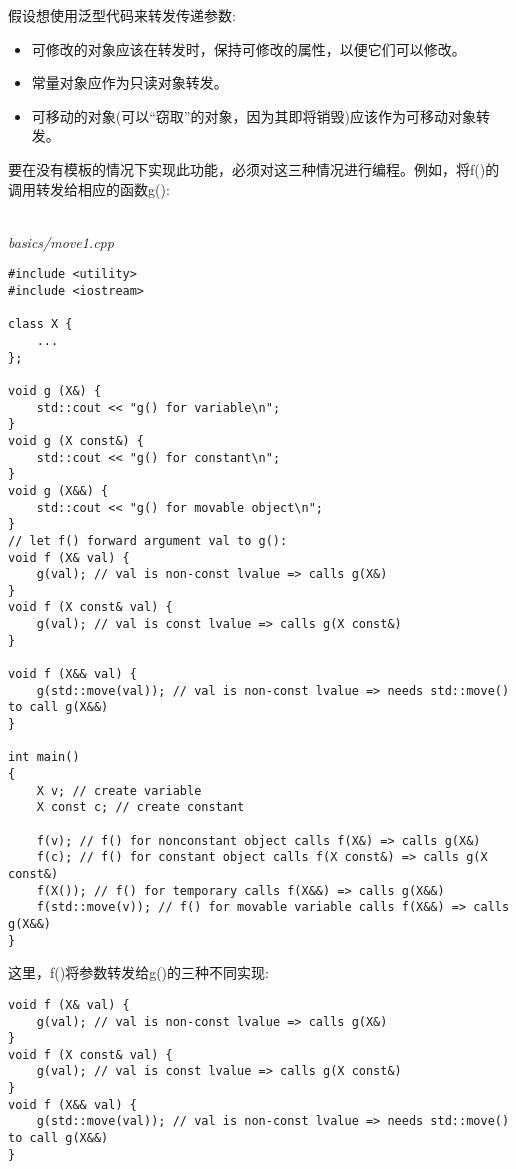 假设想使用泛型代码来转发传递参数:

\begin{itemize}
\item 
可修改的对象应该在转发时，保持可修改的属性，以便它们可以修改。

\item 
常量对象应作为只读对象转发。

\item 
可移动的对象(可以“窃取”的对象，因为其即将销毁)应该作为可移动对象转发。
\end{itemize}

要在没有模板的情况下实现此功能，必须对这三种情况进行编程。例如，将f()的调用转发给相应的函数g():

\hspace*{\fill} \\ %
\noindent
\textit{basics/move1.cpp}
\begin{lstlisting}[style=styleCXX]
#include <utility>
#include <iostream>

class X {
	...
};

void g (X&) {
	std::cout << "g() for variable\n";
}
void g (X const&) {
	std::cout << "g() for constant\n";
}
void g (X&&) {
	std::cout << "g() for movable object\n";
}
// let f() forward argument val to g():
void f (X& val) {
	g(val); // val is non-const lvalue => calls g(X&)
}
void f (X const& val) {
	g(val); // val is const lvalue => calls g(X const&)
}

void f (X&& val) {
	g(std::move(val)); // val is non-const lvalue => needs std::move() to call g(X&&)
}

int main()
{
	X v; // create variable
	X const c; // create constant
	
	f(v); // f() for nonconstant object calls f(X&) => calls g(X&)
	f(c); // f() for constant object calls f(X const&) => calls g(X const&)
	f(X()); // f() for temporary calls f(X&&) => calls g(X&&)
	f(std::move(v)); // f() for movable variable calls f(X&&) => calls g(X&&)
}
\end{lstlisting}

这里，f()将参数转发给g()的三种不同实现:

\begin{lstlisting}[style=styleCXX]
void f (X& val) {
	g(val); // val is non-const lvalue => calls g(X&)
}
void f (X const& val) {
	g(val); // val is const lvalue => calls g(X const&)
}
void f (X&& val) {
	g(std::move(val)); // val is non-const lvalue => needs std::move() to call g(X&&)
}
\end{lstlisting}

